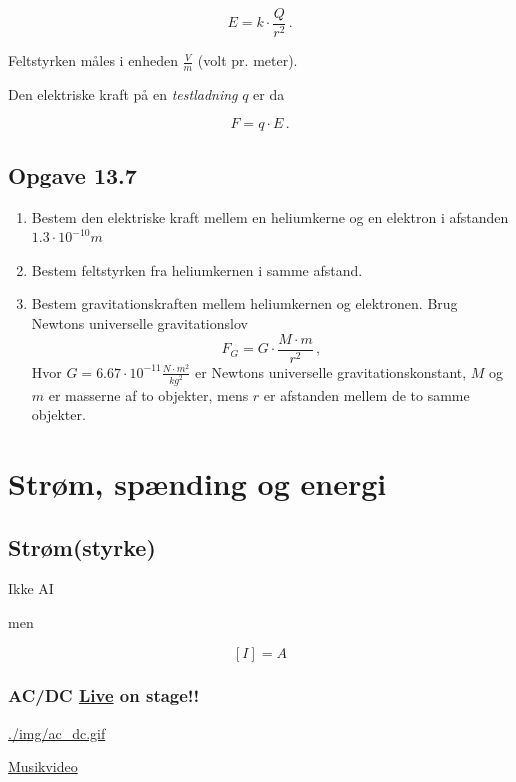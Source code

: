 \documentclass[11pt]{article}
\begin{document}
$$E = k \cdot \frac{Q}{r^2}\,.$$

Feltstyrken måles i enheden \(\frac{V}{m}\) (volt pr. meter).

Den elektriske kraft på en \emph{testladning} \(q\) er da

$$F = q \cdot E\,.$$

\subsection*{Opgave 13.7}
\label{sec:org1d64e63}
\begin{enumerate}
\item Bestem den elektriske kraft mellem en heliumkerne og en elektron i afstanden \(1.3\cdot 10^{-10}m\)
\item Bestem feltstyrken fra heliumkernen i samme afstand.
\item Bestem gravitationskraften mellem heliumkernen og elektronen. Brug Newtons universelle gravitationslov
$$F_G = G \cdot \frac{M \cdot m}{r^2}\,,$$
Hvor \(G= 6.67\cdot 10^{-11} \frac{N \cdot m^2}{kg^2}\) er Newtons universelle gravitationskonstant, \(M\) og \(m\) er masserne af to objekter, mens \(r\) er afstanden mellem de to samme objekter.
\end{enumerate}

\section*{Strøm, spænding og energi}
\label{sec:org6ff277e}
\subsection*{Strøm(styrke)}
\label{sec:org7b635a5}
Ikke AI

men

$$\left[ I \right] = A$$

\subsubsection*{AC/DC \underline{Live} on stage!!}
\label{sec:org5174897}
\url{./img/ac\_dc.gif}

\href{https://youtu.be/v2AC41dglnM}{Musikvideo}
\end{document}
